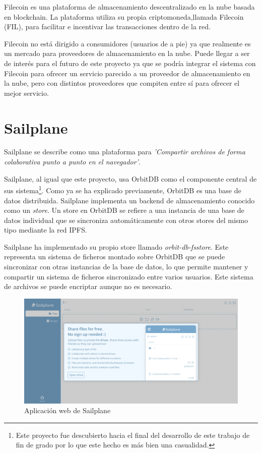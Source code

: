 Filecoin\cite{filecoinDecentralizedStorageNetwork} es una plataforma de almacenamiento descentralizado en la nube basada en
blockchain. La plataforma utiliza su propia criptomoneda,llamada Filecoin (FIL), para facilitar e incentivar las transacciones dentro
de la red.

Filecoin no está dirigido a consumidores (usuarios de a pie) ya que realmente es un mercado para proveedores de almacenamiento en la nube. Puede llegar
a ser de interés para el futuro de este proyecto ya que se podría integrar el sistema con Filecoin para ofrecer un servicio parecido
a un proveedor de almacenamiento en la nube, pero con distintos proveedores que compiten entre sí para ofrecer el mejor servicio.

\section{Sailplane}

Sailplane se describe como una plataforma para \textit{'Compartir archivos de forma colaborativa punto a punto en el navegador'}.

Sailplane, al igual que este proyecto, usa OrbitDB como el componente central de sus sistema\footnote{Este proyecto fue descubierto
    hacia el final del desarrollo de este trabajo de fin de grado por lo que este hecho es más bien una casualidad.}.
Como ya se ha explicado previamente, OrbitDB es una base de datos distribuida. Sailplane implementa un backend de almacenamiento
conocido como un \textit{store}. Un store en OrbitDB se refiere a una instancia de una base de datos individual que se sincroniza
automáticamente con otros stores del mismo tipo mediante la red IPFS.

Sailplane ha implementado su propio store llamado \textit{orbit-db-fsstore}\cite{TabcatOrbitdbfsstoreCustom}. Este representa
un sistema de ficheros montado sobre OrbitDB que se puede sincronizar con otras instancias de la base de datos, lo que permite
mantener y compartir un sistema de ficheros sincronizado entre varios usuarios. Este sistema de archivos se puede encriptar aunque no es necesario.

\begin{figure}[H]
    \centering
    \small
    \includegraphics[width=\linewidth]{images/sailplane.png}
    \caption{Aplicación web de Sailplane}
    \label{fig:sailplaneweb}
\end{figure}

